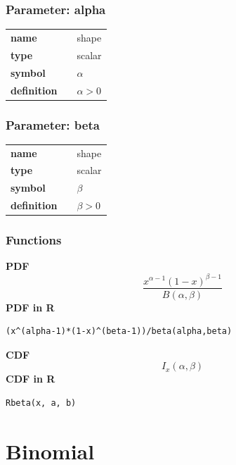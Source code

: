 \documentclass{article}
\begin{document}
\subsubsection*{Parameter: alpha}

\noindent\begin{tabular}{p{2cm}cl}
\textbf{name} & & shape \\
\textbf{type} & & scalar \\
\textbf{symbol} & & $\alpha$  \\
\textbf{definition} & & $\alpha > 0$
\end{tabular}
\subsubsection*{Parameter: beta}

\noindent\begin{tabular}{p{2cm}cl}
\textbf{name} & & shape \\
\textbf{type} & & scalar \\
\textbf{symbol} & & $\beta$  \\
\textbf{definition} & & $\beta > 0$
\end{tabular}
\subsubsection*{Functions}

\smallskip \noindent \hspace{.2cm} \textbf{PDF} 
\begin{equation*}\frac{x^{\alpha-1}(1-x)^{\beta-1}} {B(\alpha,\beta)} \end{equation*}
\smallskip \noindent \hspace{.2cm} \textbf{PDF in R}  
\begin{verbatim}(x^(alpha-1)*(1-x)^(beta-1))/beta(alpha,beta)\end{verbatim}
\smallskip \noindent \hspace{.2cm} \textbf{CDF} 
\begin{equation*}I_x(\alpha,\beta)\end{equation*}
\smallskip \noindent \hspace{.2cm} \textbf{CDF in R} 
\begin{verbatim}Rbeta(x, a, b)\end{verbatim}
\smallskip\section*{Binomial} 
\end{document}
